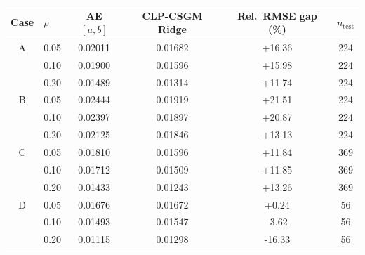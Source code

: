 \begin{tabular}{clcccc}
\toprule
Case & $\rho$ & AE \([u,b]\) & CLP-CSGM Ridge & Rel.\ RMSE gap (\%) & $n_{\mathrm{test}}$ \\
\midrule
A & 0.05 & 0.02011 & 0.01682 & +16.36 & 224 \\
 & 0.10 & 0.01900 & 0.01596 & +15.98 & 224 \\
 & 0.20 & 0.01489 & 0.01314 & +11.74 & 224 \\
\midrule
B & 0.05 & 0.02444 & 0.01919 & +21.51 & 224 \\
 & 0.10 & 0.02397 & 0.01897 & +20.87 & 224 \\
 & 0.20 & 0.02125 & 0.01846 & +13.13 & 224 \\
\midrule
C & 0.05 & 0.01810 & 0.01596 & +11.84 & 369 \\
 & 0.10 & 0.01712 & 0.01509 & +11.85 & 369 \\
 & 0.20 & 0.01433 & 0.01243 & +13.26 & 369 \\
\midrule
D & 0.05 & 0.01676 & 0.01672 & +0.24 & 56 \\
 & 0.10 & 0.01493 & 0.01547 & -3.62 & 56 \\
 & 0.20 & 0.01115 & 0.01298 & -16.33 & 56 \\
\bottomrule
\end{tabular}

